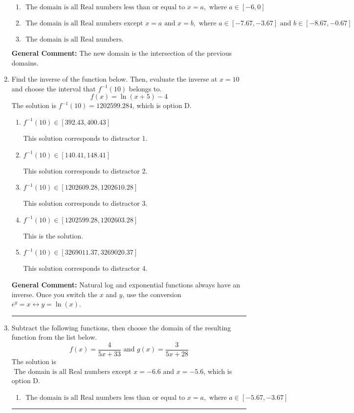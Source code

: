 \documentclass{extbook}[14pt]
\newcommand{\litem}[1]{\item #1

\rule{\textwidth}{0.4pt}}
\begin{document}
\begin{enumerate}
{\begin{enumerate}[label=\Alph*.]
\item \( \text{ The domain is all Real numbers less than or equal to } x = a, \text{ where } a \in [-6, 0] \)


\item \( \text{ The domain is all Real numbers except } x = a \text{ and } x = b, \text{ where } a \in [-7.67, -3.67] \text{ and } b \in [-8.67, -0.67] \)


\item \( \text{ The domain is all Real numbers. } \)


\end{enumerate}

\textbf{General Comment:} The new domain is the intersection of the previous domains.
}
\litem{
Find the inverse of the function below. Then, evaluate the inverse at $x = 10$ and choose the interval that $f^{-1}(10)$ belongs to.
\[ f(x) = \ln{(x+5)}-4 \]The solution is \( f^{-1}(10) = 1202599.284 \), which is option D.\begin{enumerate}[label=\Alph*.]
\item \( f^{-1}(10) \in [392.43, 400.43] \)

 This solution corresponds to distractor 1.
\item \( f^{-1}(10) \in [140.41, 148.41] \)

 This solution corresponds to distractor 2.
\item \( f^{-1}(10) \in [1202609.28, 1202610.28] \)

 This solution corresponds to distractor 3.
\item \( f^{-1}(10) \in [1202599.28, 1202603.28] \)

 This is the solution.
\item \( f^{-1}(10) \in [3269011.37, 3269020.37] \)

 This solution corresponds to distractor 4.
\end{enumerate}

\textbf{General Comment:} Natural log and exponential functions always have an inverse. Once you switch the $x$ and $y$, use the conversion $ e^y = x \leftrightarrow y=\ln(x)$.
}
\litem{
Subtract the following functions, then choose the domain of the resulting function from the list below.
\[ f(x) = \frac{4}{5x+33} \text{ and } g(x) = \frac{3}{5x+28} \]The solution is \( \text{ The domain is all Real numbers except } x = -6.6 \text{ and } x = -5.6 \), which is option D.\begin{enumerate}[label=\Alph*.]
\item \( \text{ The domain is all Real numbers less than or equal to } x = a, \text{ where } a \in [-5.67, -3.67] \)



\end{enumerate}}
\end{enumerate}
\end{document}
